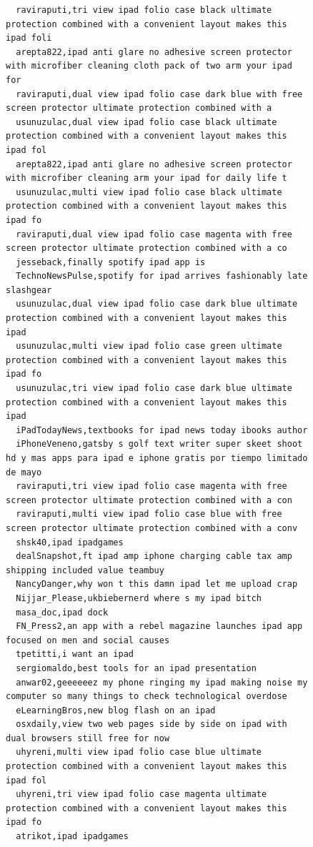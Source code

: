 \begin{figure}[htpb]
\begin{verbatim}
  raviraputi,tri view ipad folio case black ultimate protection combined with a convenient layout makes this ipad foli
  arepta822,ipad anti glare no adhesive screen protector with microfiber cleaning cloth pack of two arm your ipad for
  raviraputi,dual view ipad folio case dark blue with free screen protector ultimate protection combined with a
  usunuzulac,dual view ipad folio case black ultimate protection combined with a convenient layout makes this ipad fol
  arepta822,ipad anti glare no adhesive screen protector with microfiber cleaning arm your ipad for daily life t
  usunuzulac,multi view ipad folio case black ultimate protection combined with a convenient layout makes this ipad fo
  raviraputi,dual view ipad folio case magenta with free screen protector ultimate protection combined with a co
  jesseback,finally spotify ipad app is
  TechnoNewsPulse,spotify for ipad arrives fashionably late slashgear
  usunuzulac,dual view ipad folio case dark blue ultimate protection combined with a convenient layout makes this ipad
  usunuzulac,multi view ipad folio case green ultimate protection combined with a convenient layout makes this ipad fo
  usunuzulac,tri view ipad folio case dark blue ultimate protection combined with a convenient layout makes this ipad
  iPadTodayNews,textbooks for ipad news today ibooks author
  iPhoneVeneno,gatsby s golf text writer super skeet shoot hd y mas apps para ipad e iphone gratis por tiempo limitado de mayo
  raviraputi,tri view ipad folio case magenta with free screen protector ultimate protection combined with a con
  raviraputi,multi view ipad folio case blue with free screen protector ultimate protection combined with a conv
  shsk40,ipad ipadgames
  dealSnapshot,ft ipad amp iphone charging cable tax amp shipping included value teambuy
  NancyDanger,why won t this damn ipad let me upload crap
  Nijjar_Please,ukbiebernerd where s my ipad bitch
  masa_doc,ipad dock
  FN_Press2,an app with a rebel magazine launches ipad app focused on men and social causes
  tpetitti,i want an ipad
  sergiomaldo,best tools for an ipad presentation
  anwar02,geeeeeez my phone ringing my ipad making noise my computer so many things to check technological overdose
  eLearningBros,new blog flash on an ipad
  osxdaily,view two web pages side by side on ipad with dual browsers still free for now
  uhyreni,multi view ipad folio case blue ultimate protection combined with a convenient layout makes this ipad fol
  uhyreni,tri view ipad folio case magenta ultimate protection combined with a convenient layout makes this ipad fo
  atrikot,ipad ipadgames

\end{verbatim}
\end{figure}
